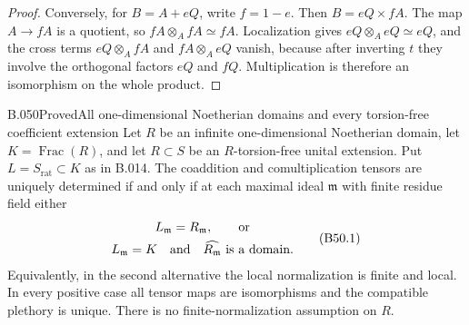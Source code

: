 \begin{proof}
Conversely, for $B=A+eQ$, write $f=1-e$. Then
$B=eQ\times fA$. The map $A\to fA$ is a quotient,
so $fA\otimes_A fA\simeq fA$. Localization gives
$eQ\otimes_A eQ\simeq eQ$, and the cross terms
$eQ\otimes_A fA$ and $fA\otimes_A eQ$ vanish,
because after inverting $t$ they involve the
orthogonal factors $eQ$ and $fQ$. Multiplication
is therefore an isomorphism on the whole product.
\end{proof}

\begin{saresult}{B.050}{Proved}{All one-dimensional Noetherian domains and every torsion-free coefficient extension}
Let $R$ be an infinite one-dimensional Noetherian domain,
let $K=\operatorname{Frac}(R)$, and let $R\subset S$
be an $R$-torsion-free unital extension. Put
$L=S_{\mathrm{rat}}\subset K$ as in B.014.
The coaddition and comultiplication tensors are
uniquely determined if and only if at each maximal
ideal $\mathfrak m$ with finite residue field either
\[
 \begin{gathered}
 L_{\mathfrak m}=R_{\mathfrak m},\qquad\hbox{or}\\
 L_{\mathfrak m}=K\quad\hbox{and}\quad
 \widehat{R_{\mathfrak m}}\hbox{ is a domain}.
 \end{gathered}                                            \tag{B50.1}
\]
Equivalently, in the second alternative the local
normalization is finite and local. In every positive
case all tensor maps are isomorphisms and the
compatible plethory is unique. There is no
finite-normalization assumption on $R$.
\end{saresult}
